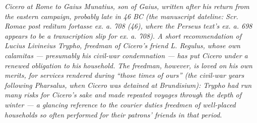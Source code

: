 
\textit{Cicero at Rome to Gaius Munatius, son of Gaius, written
after his return from the eastern campaign, probably late in 46
BC (the manuscript dateline: \textit{Scr. Romae post reditum
fortasse ex. a. 708 (46)}, where the Perseus text's
\textit{ex. a. 698} appears to be a transcription slip for
\textit{ex. a. 708}). A short recommendation of Lucius
Livineius Trypho, freedman of Cicero's friend L. Regulus, whose
own \textit{calamitas} --- presumably his civil-war
condemnation --- has put Cicero under a renewed obligation to
his household. The freedman, however, is loved on his own
merits, for services rendered during ``those times of ours''
(the civil-war years following Pharsalus, when Cicero was
detained at Brundisium): Trypho had run many risks for Cicero's
sake and made repeated voyages through the depth of winter --- a
glancing reference to the courier duties freedmen of well-placed
households so often performed for their patrons' friends in
that period.}
